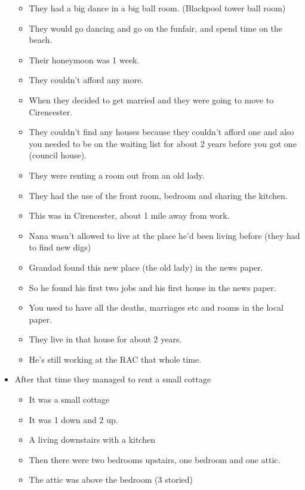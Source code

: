 \documentclass[10pt,twocolumn,letterpaper]{article}
\begin{document}
\begin{itemize}
\begin{itemize}
              \item They had a big dance in a big ball room. (Blackpool tower ball room)
              \item They would go dancing and go on the funfair, and spend time on the beach.
              \item Their honeymoon was 1 week.
              \item They couldn't afford any more.
              \item When they decided to get married and they were going to move to Cirencester.
              \item They couldn't find any houses because they couldn't afford one and also you needed to be on the waiting list for about 2 years before you got one (council house).
              \item They were renting a room out from an old lady.
              \item They had the use of the front room, bedroom and sharing the kitchen.
              \item This was in Cirencester, about 1 mile away from work.
              \item Nana wasn't allowed to live at the place he'd been living before (they had to find new digs)
              \item Grandad found this new place (the old lady) in the news paper.
              \item So he found his first two jobs and his first house in the news paper.
              \item You used to have all the deaths, marriages etc and rooms in the local paper.
              \item They live in that house for about 2 years.
              \item He's still working at the RAC that whole time.
          \end{itemize}
    \item After that time they managed to rent a small cottage
          \begin{itemize}
              \item It was a small cottage
              \item It was 1 down and 2 up.
              \item A living downstairs with a kitchen
              \item Then there were two bedrooms upstairs, one bedroom and one attic.
              \item The attic was above the bedroom (3 storied)

\end{itemize}
\end{itemize}
\end{document}
